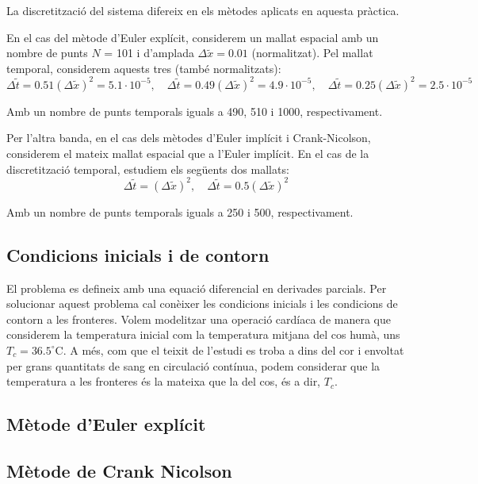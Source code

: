 \documentclass[a4paper,12pt,oneside]{article}
\begin{document}
La discretització del sistema difereix en els mètodes aplicats en aquesta pràctica.

En el cas del mètode d'Euler explícit, considerem un mallat espacial amb un nombre de punts $N$ = 101 i d'amplada $\Delta \widetilde{x} = 0.01$ (normalitzat). 
Pel mallat temporal, considerem aquests tres (també normalitzats):
\begin{equation*}
    \Delta \widetilde{t} = 0.51 (\Delta \widetilde{x})^2 = 5.1 \cdot 10^{-5}, \quad \Delta \widetilde{t} = 0.49 (\Delta \widetilde{x})^2 = 4.9 \cdot 10^{-5}, \quad \Delta \widetilde{t} = 0.25 (\Delta \widetilde{x})^2 = 2.5 \cdot 10^{-5}
\end{equation*}

Amb un nombre de punts temporals iguals a 490, 510 i 1000, respectivament.

Per l'altra banda, en el cas dels mètodes d'Euler implícit i Crank-Nicolson, considerem el mateix mallat espacial que a l'Euler 
implícit. En el cas de la discretització temporal, estudiem els següents dos mallats:
\begin{equation*}
    \Delta \widetilde{t} = (\Delta \widetilde{x})^2, \quad \Delta \widetilde{t} = 0.5 (\Delta \widetilde{x})^2
\end{equation*}

Amb un nombre de punts temporals iguals a 250 i 500, respectivament.

\subsection{Condicions inicials i de contorn}

El problema es defineix amb una equació diferencial en derivades parcials. Per solucionar aquest problema cal conèixer les condicions 
inicials i les condicions de contorn a les fronteres. Volem modelitzar una operació cardíaca de manera que considerem la temperatura 
inicial com la temperatura mitjana del cos humà, uns $T_c = 36.5 ^\circ$C. A més, com que el teixit de l'estudi es troba a dins 
del cor i envoltat per grans quantitats de sang en circulació contínua, podem considerar que la temperatura a les fronteres és 
la mateixa que la del cos, és a dir, $T_c$.


\subsection{Mètode d'Euler explícit}

\subsection{Mètode de Crank Nicolson}
\end{document}
